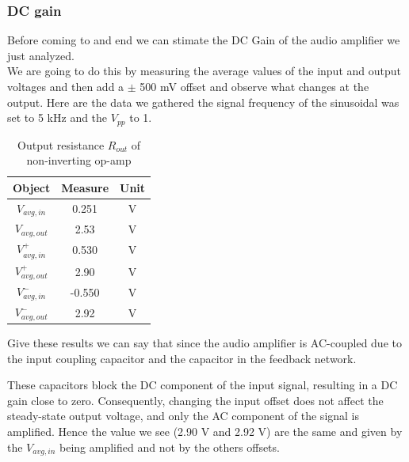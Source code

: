 \documentclass[../main.tex]{subfiles}
\begin{document}
\subsubsection*{DC gain}

Before coming to and end we can stimate the DC Gain of the audio amplifier we just analyzed.\\

We are going to do this by measuring the average values of the input and output voltages and then add a $\pm$ 500 mV offset and observe what changes at the output. Here are the data we gathered the signal frequency of the sinusoidal was set to 5 kHz and the $V_{pp}$ to 1.


\begin{table}[h!]
\centering	

\begin{tabular}{ccc}
\textbf{Object} & \textbf{Measure} & \textbf{Unit} \\

\hline
$V_{avg,in}$ & 0.251 & V \\
\hline
$V_{avg,out}$ & 2.53 & V \\

\hline
$V_{avg,in}^+$ & 0.530 & V \\
\hline
$V_{avg,out}^+$ & 2.90 & V \\

\hline
$V_{avg,in}^-$ & -0.550 & V \\
\hline
$V_{avg,out}^-$ & 2.92 & V \\

\end{tabular}
\caption*{Output resistance $R_{out}$ of non-inverting op-amp}
\end{table}

Give these results we can say that since the audio amplifier is AC-coupled due to the input coupling capacitor and the capacitor in the feedback network. 

These capacitors block the DC component of the input signal, resulting in a DC gain close to zero. Consequently, changing the input offset does not affect the steady-state output voltage, and only the AC component of the signal is amplified.
Hence the value we see (2.90 V and 2.92 V) are the same and given by the $V_{avg,in}$ being amplified and not by the others offsets.
\end{document}
